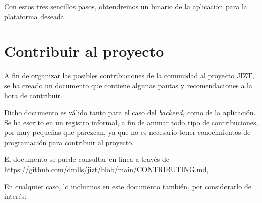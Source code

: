 Con estos tres sencillos pasos, obtendremos un binario de la aplicación para la plataforma deseada.



\section{Contribuir al proyecto}

A fin de organizar las posibles contribuciones de la comunidad al proyecto JIZT, se ha creado un documento que contiene algunas pautas y recomendaciones a la hora de contribuir.

Dicho documento es válido tanto para el caso del \emph{backend}, como de la aplicación. Se ha escrito en un registro informal, a fin de animar todo tipo de contribuciones, por muy pequeñas que parezcan, ya que no es necesario tener conocimientos de programación para contribuir al proyecto.

El documento se puede consultar en línea a través de \href{https://github.com/dmlls/jizt/blob/main/CONTRIBUTING.md}{https://github.com/\newline dmlls/jizt/blob/main/CONTRIBUTING.md},

En cualquier caso, lo incluimos en este documento también, por considerarlo de interés:

